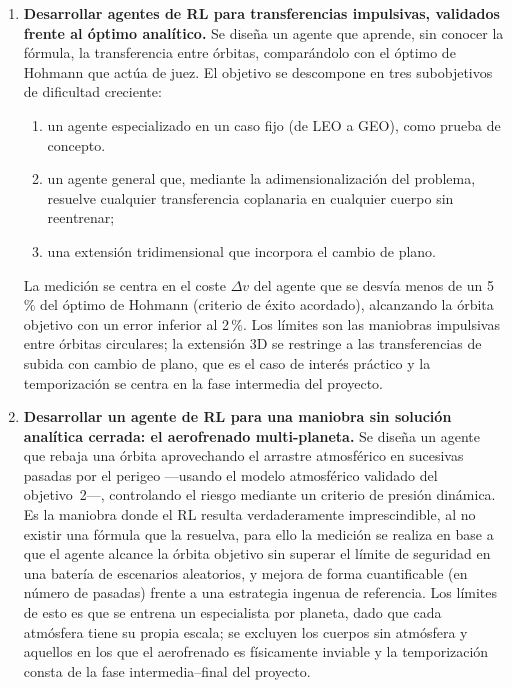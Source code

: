 \begin{enumerate}
  \item \textbf{Desarrollar agentes de \gls{RL} para transferencias impulsivas, validados frente al óptimo analítico.} Se diseña un agente que aprende, sin conocer la fórmula, la transferencia entre órbitas, comparándolo con el óptimo de Hohmann que actúa de juez. El objetivo se descompone en tres subobjetivos de dificultad creciente:
  
  \begin{enumerate}
    \item un agente especializado en un caso fijo (de \gls{LEO} a \gls{GEO}), como prueba de concepto.
    \item un agente general que, mediante la adimensionalización del problema, resuelve cualquier transferencia coplanaria en cualquier cuerpo sin reentrenar;
    \item una extensión tridimensional que incorpora el cambio de plano.
  \end{enumerate}
  
  La medición se centra en el coste $\Delta v$ del agente que se desvía menos de un 5\,\% del óptimo de Hohmann (criterio de éxito acordado), alcanzando la órbita objetivo con un error inferior al 2\,\%. Los límites son las maniobras impulsivas entre órbitas circulares; la extensión 3D se restringe a las transferencias de subida con cambio de plano, que es el caso de interés práctico y la temporización se centra en la fase intermedia del proyecto.

  \item \textbf{Desarrollar un agente de \gls{RL} para una maniobra sin solución analítica cerrada: el aerofrenado multi-planeta.} Se diseña un agente que rebaja una órbita aprovechando el arrastre atmosférico en sucesivas pasadas por el perigeo ---usando el modelo atmosférico validado del objetivo~2---, controlando el riesgo mediante un criterio de presión dinámica. Es la maniobra donde el \gls{RL} resulta verdaderamente imprescindible, al no existir una fórmula que la resuelva, para ello la medición se realiza en base a que el agente alcance la órbita objetivo sin superar el límite de seguridad en una batería de escenarios aleatorios, y mejora de forma cuantificable (en número de pasadas) frente a una estrategia ingenua de referencia. Los límites de esto es que se entrena un especialista por planeta, dado que cada atmósfera tiene su propia escala; se excluyen los cuerpos sin atmósfera y aquellos en los que el aerofrenado es físicamente inviable y la temporización consta de la fase intermedia--final del proyecto.


\end{enumerate}
